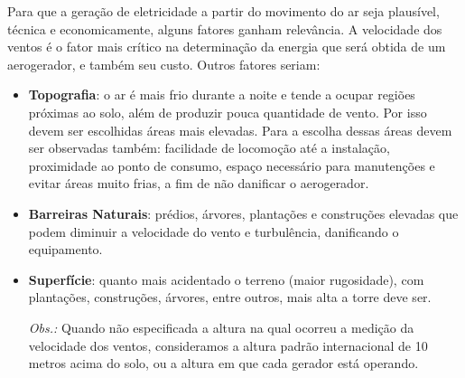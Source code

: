     Para que a geração de eletricidade a partir do movimento do ar seja plausível, técnica e economicamente, alguns fatores
    ganham relevância. A velocidade dos ventos é o fator mais crítico na determinação da energia que será obtida de um
    aerogerador, e também seu custo. Outros fatores seriam:
    \begin{itemize}
     \item \textbf{Topografia}: o ar é mais frio durante a noite e tende a ocupar regiões próximas ao solo, além de produzir
	pouca quantidade de vento. Por isso devem ser escolhidas áreas mais elevadas. Para a escolha dessas áreas devem ser
	observadas também: facilidade de locomoção até a instalação, proximidade ao ponto de consumo, espaço necessário
	para manutenções e evitar áreas muito frias, a fim de não danificar o aerogerador.
	
     \item \textbf{Barreiras Naturais}: prédios, árvores, plantações e construções elevadas que podem diminuir
	a velocidade do vento e turbulência, danificando o equipamento.
      
     \item \textbf{Superfície}: quanto mais acidentado o terreno (maior rugosidade), com plantações, construções, árvores, entre outros,
	mais alta a torre deve ser.
      
     \textit{Obs.:} Quando não especificada a altura na qual ocorreu a medição da velocidade dos ventos,
	consideramos a altura padrão internacional de 10 metros acima do solo, ou a altura em que cada gerador está operando. 
     
    \end{itemize}

